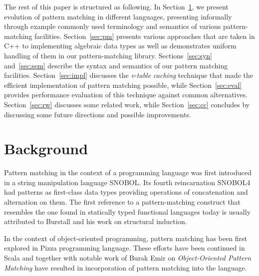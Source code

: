 \documentclass[preprint]{sigplanconf}
\begin{document}
The rest of this paper is structured as following. In Section~\ref{sec:bg}, we 
present evolution of pattern matching in different languages, presenting 
informally through example commonly used terminology and semantics of various 
pattern-matching facilities. Section~\ref{sec:pm} presents various approaches 
that are taken in C++ to implementing algebraic data types as well as 
demonstrates uniform handling of them in our pattern-matching library. 
Sections~\ref{sec:syn} and~\ref{sec:sem} describe the syntax and semantics of 
our pattern matching facilities.
Section~\ref{sec:impl} discusses the \emph{v-table caching} technique that made 
the efficient implementation of pattern matching possible, while 
Section~\ref{sec:eval} provides performance evaluation of this technique against 
common alternatives. Section~\ref{sec:rw} discusses some related work, while 
Section~\ref{sec:cc} concludes by discussing some future directions and possible 
improvements.

\section{Background} %
\label{sec:bg}


Pattern matching in the context of a programming language was first introduced 
in a string manipulation language SNOBOL\cite{SNOBOL64}. Its fourth 
reincarnation SNOBOL4 had patterns as first-class data types providing 
operations of concatenation and alternation on them\cite{SNOBOL71}. The first 
reference to a pattern-matching construct that resembles the one found in 
statically typed functional languages today is usually attributed to Burstall 
and his work on structural induction\cite{Burstall69provingproperties}.


In the context of object-oriented programming, pattern matching has been first 
explored in Pizza programming language\cite{Odersky97pizzainto}. These efforts 
have been continued in Scala\cite{Scala2nd} and together with notable work of 
Burak Emir on \emph{Object-Oriented Pattern Matching}\cite{EmirThesis} have 
resulted in incorporation of pattern matching into the language.
\end{document}

